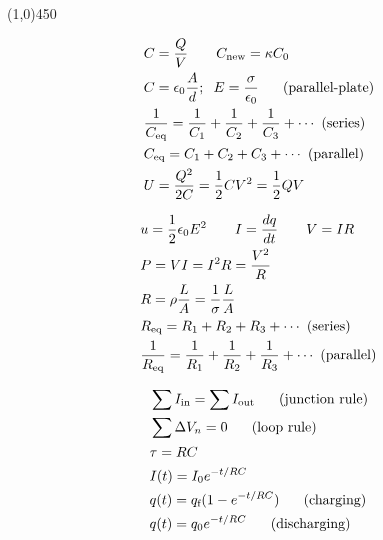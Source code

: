 \documentclass[9pt,letterpaper]{article}
\begin{document}
\vspace{-0.4in}
\begin{center}
\line(1,0){450}
\end{center}

\vspace{-0.3in}
\begin{minipage}[t]{0.30\linewidth}
\begin{align*}
    &C = \frac{Q}{V} \qquad C_{\text{new}} = \kappa C_{0}\\
    &C = \epsilon_{0} \frac{A}{d};\hspace{2mm} E = \frac{\sigma}{\epsilon_{0}} \hspace{0.05\linewidth}\text{(parallel-plate)}\\
    &\frac{1}{C_{\text{eq}}} = \frac{1}{C_{1}} + \frac{1}{C_{2}} + \frac{1}{C_{3}} + \cdots \hspace{0.01\linewidth}\text{(series)}\\
    &C_{\text{eq}} = C_{1} + C_{2} +C_{3} + \cdots \hspace{0.01\linewidth}\text{(parallel)}\\
    &U = \frac{Q^2}{2 C} = \frac{1}{2}CV^{2} =\frac{1}{2}QV\\
\end{align*}
\end{minipage}
\begin{minipage}[t]{0.33\linewidth}
\begin{align*}
    &u = \frac{1}{2}\epsilon_{0}E^{2} \qquad I = \frac{dq}{dt} \qquad V = IR\\
    &P = VI = I^{2}R = \frac{V^{2}}{R}\\
    &R =\rho\frac{L}{A}=\frac{1}{\sigma}\frac{L}{A}\\
    &R_{\text{eq}} = R_{1} + R_{2} + R_{3} + \cdots \hspace{0.01\linewidth}\text{(series)}\\
    &\frac{1}{R_{\text{eq}}} = \frac{1}{R_{1}} + \frac{1}{R_{2}} + \frac{1}{R_{3}} + \cdots \hspace{0.01\linewidth}\text{(parallel)}\\
\end{align*}
\end{minipage}
\hspace{-0.2in}
\begin{minipage}[t]{0.33\linewidth}
\begin{align*}
    &\sum I_{\text{in}} = \sum I_{\text{out}} \hspace{0.05\linewidth}\text{(junction rule)}\\
    &\sum \Delta V_{n} = 0 \hspace{0.05\linewidth}\text{(loop rule)}\\
    &\tau=RC\\
    &I(t) = I_{0}e^{-t/RC}\\
    &q(t) = q_{\text{f}}(1-e^{-t/RC}) \hspace{0.05\linewidth}\text{(charging)}\\
    &q(t) = q_{\text{0}}e^{-t/RC} \hspace{0.05\linewidth}\text{(discharging)}\\
\end{align*}
\end{minipage}
\end{document}
